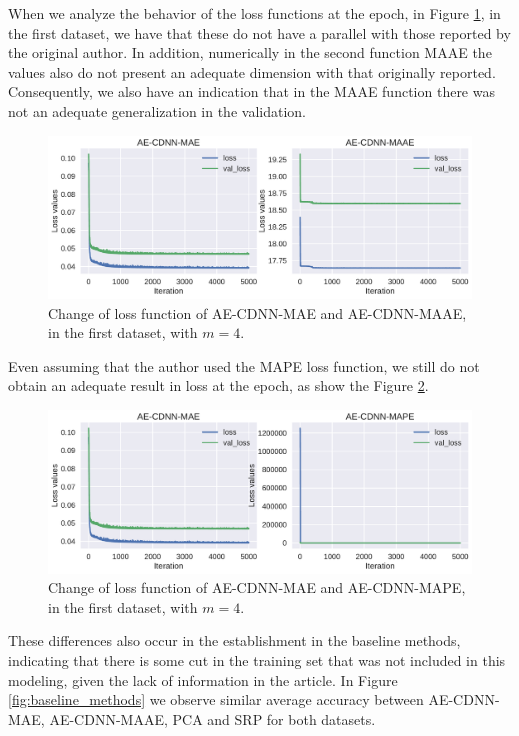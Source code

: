 \newpage

When we analyze the behavior of the loss functions at the epoch, in Figure \ref{fig:change_loss_mae_maae}, in the first dataset, we have that these do not have a parallel with those reported by the original author. In addition, numerically in the second function MAAE the values also do not present an adequate dimension with that originally reported. Consequently, we also have an indication that in the MAAE function there was not an adequate generalization in the validation.


\begin{figure}[!ht]
\centering
\includegraphics[width=0.8\linewidth]{figure/change_loss_mae_maae.pdf}
  \caption{Change of loss function of AE-CDNN-MAE and AE-CDNN-MAAE, in the first dataset, with $m=4$.}
\label{fig:change_loss_mae_maae}
\end{figure}


Even assuming that the author used the MAPE loss function, we still do not obtain an adequate result in loss at the epoch, as show the Figure \ref{fig:change_loss_mae_mape}.

\begin{figure}[!ht]
\centering
\includegraphics[width=0.8\linewidth]{figure/change_loss_mae_mape.pdf}
  \caption{Change of loss function of AE-CDNN-MAE and AE-CDNN-MAPE, in the first dataset, with $m=4$.}
\label{fig:change_loss_mae_mape}
\end{figure}


These differences also occur in the establishment in the baseline methods, indicating that there is some cut in the training set that was not included in this modeling, given the lack of information in the article. In Figure \ref{fig:baseline_methods} we observe similar average accuracy between AE-CDNN-MAE, AE-CDNN-MAAE, PCA and SRP for both datasets. 


